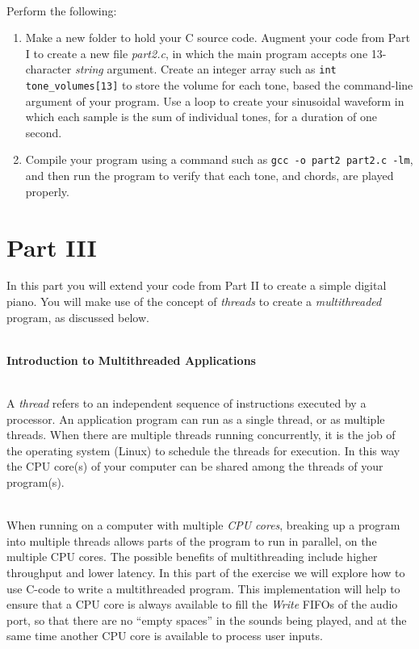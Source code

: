 \documentclass[epsfig,10pt,fullpage]{article}
\begin{document}
~\\
\noindent
Perform the following:

\begin{enumerate}
\item Make a new folder to hold your C source code. Augment your code from Part I to create a
new file {\it part2.c}, in which the main program accepts one 13-character {\it string} argument.
Create an integer array such as \texttt{int tone\_volumes[13]} to store the volume for
each tone, based the command-line argument of your program. Use a loop to create your
sinusoidal waveform in which each sample is the sum of individual tones, for a duration of one
second.
\item Compile your program using a command such as \texttt{gcc -o part2 part2.c -lm}, 
and then run the program to verify that each tone, and chords, are played properly.
\end{enumerate}

\noindent
\section*{Part III}

In this part you will extend your code from Part II to create a simple digital piano. You
will make use of the concept of {\it threads} to create a {\it multithreaded} program, as
discussed below. 

~\\
\noindent
{\bf Introduction to Multithreaded Applications}

~\\
\noindent
A {\it thread} refers to an independent sequence of instructions executed by a processor. An 
application program can run as a single thread, or as multiple threads. When there are multiple
threads running concurrently, it is the job of the operating system (Linux) to schedule 
the threads for execution. In this way the CPU core(s) of your computer can be shared among the 
threads of your program(s).

~\\
\noindent
When running on a computer with multiple {\it CPU cores}, breaking up a program into
multiple threads allows parts of the program to run in parallel, on the multiple CPU cores.
The possible benefits of multithreading include higher throughput and lower latency. 
In this part of the exercise we will explore how to use C-code to write a
multithreaded program. This implementation will
help to ensure that a CPU core is always available to fill the {\it Write} FIFOs of the
audio port, so that there are no ``empty spaces'' in the sounds being played, and at the
same time another CPU core is available to process user inputs. 
\end{document}
